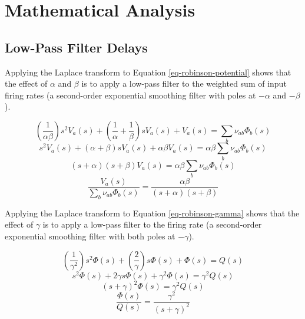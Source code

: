 
\section{Mathematical Analysis}
\label{sect-robinson-math}

%
%
\subsection{Low-Pass Filter Delays}
\label{sect-robinson-math-lowpass}

Applying the Laplace transform to Equation \ref{eq-robinson-potential} shows
that the effect of $\alpha$ and $\beta$ is to apply a low-pass filter to the
weighted sum of input firing rates (a second-order exponential smoothing
filter with poles at $-\alpha$ and $-\beta$).

\begin{equation}
\left ( \frac{1}{\alpha \beta} \right ) s^2 V_a(s)
+ \left ( \frac{1}{\alpha} + \frac{1}{\beta} \right ) s V_a(s)
+ V_a(s) = \sum_b \nu_{ab} \Phi_b(s)
\end{equation}
%
\begin{equation}
s^2 V_a(s) + (\alpha + \beta) s V_a(s) + \alpha \beta V_a(s)
= \alpha \beta \sum_b \nu_{ab} \Phi_b(s)
\end{equation}
%
\begin{equation}
(s + \alpha) (s + \beta) V_a(s) = \alpha \beta \sum_b \nu_{ab} \Phi_b(s)
\end{equation}
%
\begin{equation}
\frac{V_a(s)}{\sum_b \nu_{ab} \Phi_b(s)}
= \frac{\alpha \beta}{(s + \alpha) (s + \beta)}
\end{equation}

Applying the Laplace transform to Equation \ref{eq-robinson-gamma} shows
that the effect of $\gamma$ is to apply a low-pass filter to the firing rate
(a second-order exponential smoothing filter with both poles at $-\gamma$).

\begin{equation}
\left ( \frac{1}{\gamma^2} \right ) s^2 \Phi(s)
+ \left ( \frac{2}{\gamma} \right ) s \Phi(s) + \Phi(s) = Q(s)
\end{equation}
%
\begin{equation}
s^2 \Phi(s) + 2 \gamma s \Phi(s) + \gamma^2 \Phi(s) = \gamma^2 Q(s)
\end{equation}
%
\begin{equation}
(s + \gamma)^2 \Phi(s) = \gamma^2 Q(s)
\end{equation}
%
\begin{equation}
\frac{\Phi(s)}{Q(s)} = \frac{\gamma^2}{(s + \gamma)^2}
\end{equation}

